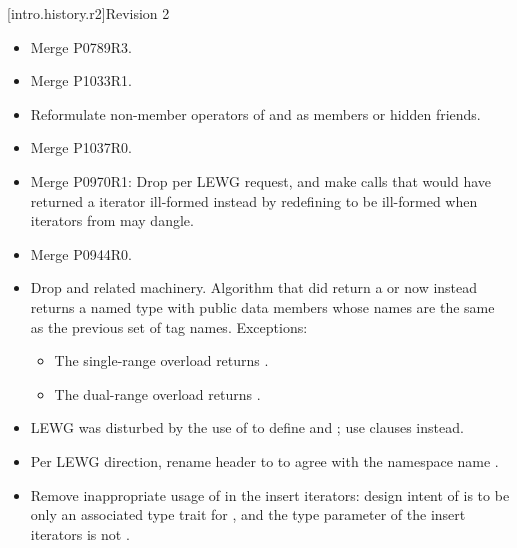 [intro.history.r2]{Revision 2}
\begin{itemize}
\item Merge P0789R3.

\item Merge P1033R1.

\item Reformulate non-member operators of  and
   as members or hidden friends.

\item Merge P1037R0.

\item Merge P0970R1: Drop  per LEWG request, and make calls that
  would have returned a  iterator ill-formed instead by
  redefining  to be ill-formed when iterators from
   may dangle.

\item Merge P0944R0.

\item Drop  and related machinery. Algorithm  that did
  return a   or  now instead returns a
  named type  with public data members whose names are the
  same as the previous set of tag names. Exceptions:
  \begin{itemize}
  \item The single-range  overload returns
    .
  \item The dual-range  overload returns
    .
  \end{itemize}

\item LEWG was disturbed by the use of  to define
   and ; use  clauses
  instead.

\item Per LEWG direction, rename header  to  to
  agree with the namespace name .

\item Remove inappropriate usage of  in the insert iterators:
  design intent of  is to be only an associated type trait
  for , and the  type parameter of the insert
  iterators is not .


\end{itemize}
